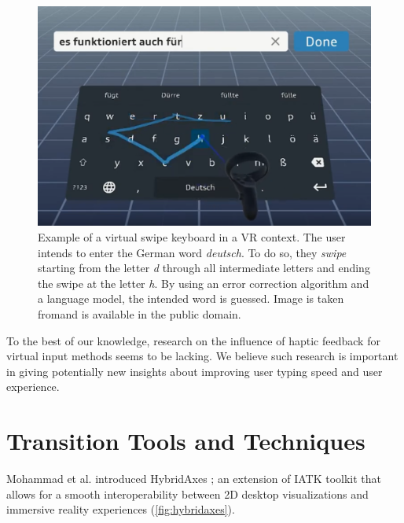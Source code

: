 \documentclass{vgtc}                          %
\begin{document}
\begin{figure}[tb]
	\centering
	\includegraphics[width=\columnwidth]{swipe_keyboard}
    \caption{Example of a virtual swipe keyboard in a VR context. The user intends to enter the German word
    \textit{deutsch}. To do so, they \textit{swipe} starting from the letter \textit{d} through all
    intermediate letters and ending the swipe at the letter \textit{h}. By using an error correction
    algorithm and a language model, the intended word is guessed. Image is taken
    from\protect\footnotemark and is available in the public domain.}
    \label{fig:swipe_keyboard}
\end{figure}


\medskip

\noindent To the best of our knowledge, research on the influence of haptic feedback for virtual input
methods seems to be lacking. We believe such research is important in giving potentially new insights about
improving user typing speed and user experience.

\section{Transition Tools and Techniques}
Mohammad et al. introduced HybridAxes \cite{hybridaxes_tool}; an extension of
IATK toolkit that allows for a smooth interoperability between 2D desktop
visualizations and immersive reality experiences (\autoref{fig:hybridaxes}).

\medskip
\end{document}

